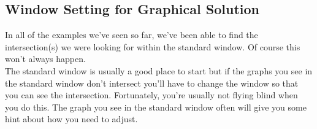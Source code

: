 %
%

\subsection{Window Setting for Graphical Solution}

In all of the examples we’ve seen so far, we’ve been able to find the intersection(s) we were looking for within the standard window. Of course this won’t always happen.\\

The standard window is usually a good place to start but if the graphs you see in the standard window don’t intersect you’ll have to change the window so that you can see the intersection.  Fortunately, you’re usually not flying blind when you do this.  The graph you see in the standard window often will give you some hint about how you need to adjust.


